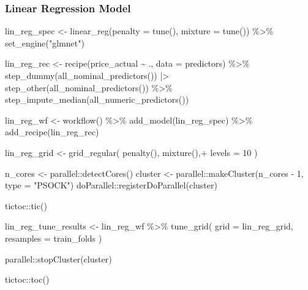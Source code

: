 \documentclass[
]{article}
\newenvironment{Shaded}{\begin{snugshade}}{\end{snugshade}}
\newcommand{\AttributeTok}[1]{\textcolor[rgb]{0.40,0.45,0.13}{#1}}
\newcommand{\DecValTok}[1]{\textcolor[rgb]{0.68,0.00,0.00}{#1}}
\newcommand{\FunctionTok}[1]{\textcolor[rgb]{0.28,0.35,0.67}{#1}}
\newcommand{\NormalTok}[1]{\textcolor[rgb]{0.00,0.23,0.31}{#1}}
\newcommand{\OtherTok}[1]{\textcolor[rgb]{0.00,0.23,0.31}{#1}}
\newcommand{\SpecialCharTok}[1]{\textcolor[rgb]{0.37,0.37,0.37}{#1}}
\newcommand{\StringTok}[1]{\textcolor[rgb]{0.13,0.47,0.30}{#1}}
\begin{document}
\subsubsection{Linear Regression Model}\label{linear-regression-model}

\begin{Shaded}
\begin{Highlighting}[]
\NormalTok{lin\_reg\_spec }\OtherTok{\textless{}{-}} \FunctionTok{linear\_reg}\NormalTok{(}\AttributeTok{penalty =} \FunctionTok{tune}\NormalTok{(), }\AttributeTok{mixture =} \FunctionTok{tune}\NormalTok{()) }\SpecialCharTok{\%\textgreater{}\%}
  \FunctionTok{set\_engine}\NormalTok{(}\StringTok{"glmnet"}\NormalTok{)}

\NormalTok{lin\_reg\_rec }\OtherTok{\textless{}{-}} \FunctionTok{recipe}\NormalTok{(price\_actual }\SpecialCharTok{\textasciitilde{}}\NormalTok{ ., }\AttributeTok{data =}\NormalTok{ predictors) }\SpecialCharTok{\%\textgreater{}\%}
  \FunctionTok{step\_dummy}\NormalTok{(}\FunctionTok{all\_nominal\_predictors}\NormalTok{()) }\SpecialCharTok{|\textgreater{}}
  \FunctionTok{step\_other}\NormalTok{(}\FunctionTok{all\_nominal\_predictors}\NormalTok{()) }\SpecialCharTok{\%\textgreater{}\%}
  \FunctionTok{step\_impute\_median}\NormalTok{(}\FunctionTok{all\_numeric\_predictors}\NormalTok{())}

\NormalTok{lin\_reg\_wf }\OtherTok{\textless{}{-}} \FunctionTok{workflow}\NormalTok{() }\SpecialCharTok{\%\textgreater{}\%}
  \FunctionTok{add\_model}\NormalTok{(lin\_reg\_spec) }\SpecialCharTok{\%\textgreater{}\%}
  \FunctionTok{add\_recipe}\NormalTok{(lin\_reg\_rec)}

\NormalTok{lin\_reg\_grid }\OtherTok{\textless{}{-}} \FunctionTok{grid\_regular}\NormalTok{(}
  \FunctionTok{penalty}\NormalTok{(),}
  \FunctionTok{mixture}\NormalTok{(),}\SpecialCharTok{+}
  \AttributeTok{levels =} \DecValTok{10}
\NormalTok{)}

\NormalTok{n\_cores }\OtherTok{\textless{}{-}}\NormalTok{ parallel}\SpecialCharTok{::}\FunctionTok{detectCores}\NormalTok{()}
\NormalTok{cluster }\OtherTok{\textless{}{-}}\NormalTok{ parallel}\SpecialCharTok{::}\FunctionTok{makeCluster}\NormalTok{(n\_cores }\SpecialCharTok{{-}} \DecValTok{1}\NormalTok{, }\AttributeTok{type =} \StringTok{"PSOCK"}\NormalTok{)}
\NormalTok{doParallel}\SpecialCharTok{::}\FunctionTok{registerDoParallel}\NormalTok{(cluster)}

\NormalTok{tictoc}\SpecialCharTok{::}\FunctionTok{tic}\NormalTok{()}

\NormalTok{lin\_reg\_tune\_results }\OtherTok{\textless{}{-}}\NormalTok{ lin\_reg\_wf }\SpecialCharTok{\%\textgreater{}\%}
  \FunctionTok{tune\_grid}\NormalTok{(}
    \AttributeTok{grid =}\NormalTok{ lin\_reg\_grid,}
    \AttributeTok{resamples =}\NormalTok{ train\_folds}
\NormalTok{  )}

\NormalTok{parallel}\SpecialCharTok{::}\FunctionTok{stopCluster}\NormalTok{(cluster)}

\NormalTok{tictoc}\SpecialCharTok{::}\FunctionTok{toc}\NormalTok{()}
\end{Highlighting}
\end{Shaded}
\end{document}
